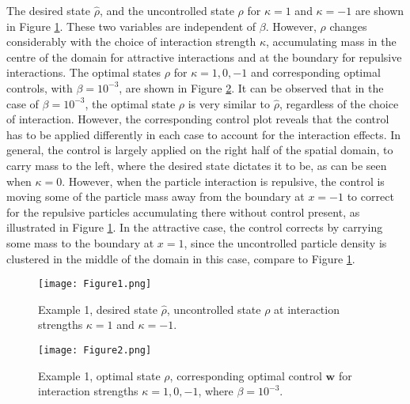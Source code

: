  The desired state $\widehat \rho$, and the uncontrolled state $\rho$ for $\kappa =1$ and $\kappa = -1$ are shown in Figure \ref{Ex12DN1}. These two variables are independent of $\beta$. However, $\rho$ changes considerably with the choice of interaction strength $\kappa$, accumulating mass in the centre of the domain for attractive interactions and at the boundary for repulsive interactions. The optimal states $\rho$ for $\kappa = 1,0,-1$ and corresponding optimal controls, with $\beta = 10^{-3}$, are shown in Figure \ref{Ex12DN2}. 
It can be observed that in the case of $\beta = 10^{-3}$, the optimal state $\rho$ is very similar to $\widehat \rho$, regardless of the choice of interaction. However, the corresponding control plot reveals that the control has to be applied differently in each case to account for the interaction effects. In general, the control is largely applied on the right half of the spatial domain, to carry mass to the left, where the desired state dictates it to be, as can be seen when $\kappa = 0$. However, when the particle interaction is repulsive, the control is moving some of the particle mass away from the boundary at $x=-1$ to correct for the repulsive particles accumulating there without control present, as illustrated in Figure \ref{Ex12DN1}. In the attractive case, the control corrects by carrying some mass to the boundary at $x=1$, since the uncontrolled particle density is clustered in the middle of the domain in this case, compare to Figure \ref{Ex12DN1}.
\begin{figure}[h]
	\texttt{[image: Figure1.png]}
	\caption{Example 1, desired state $\widehat \rho$, uncontrolled state $\rho$ at interaction strengths $\kappa =1$ and $\kappa =-1$.}
	\label{Ex12DN1}
\end{figure}
\begin{figure}[h]
	\texttt{[image: Figure2.png]}
	\caption{Example 1, optimal state $\rho$, corresponding optimal control $\mathbf{w}$ for interaction strengths $\kappa = 1,0,-1$, where $\beta = 10^{-3}$.}
	\label{Ex12DN2}
\end{figure}



